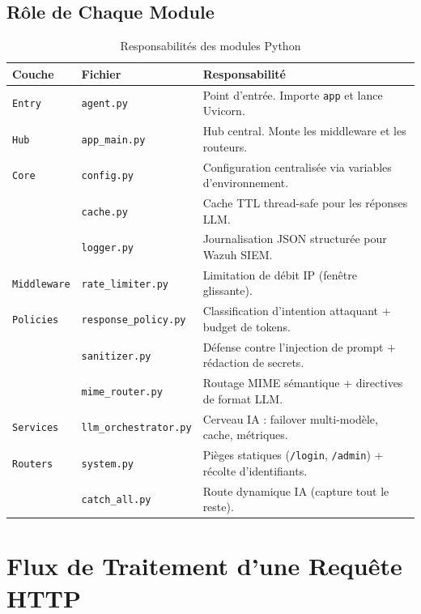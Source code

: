 \documentclass[12pt,a4paper]{article}
\begin{document}
\subsection{Rôle de Chaque Module}

\begin{table}[h!]
\centering
\small
\begin{tabularx}{\textwidth}{l l X}
\toprule
\textbf{Couche} & \textbf{Fichier} & \textbf{Responsabilité} \\
\midrule
\texttt{Entry} & \texttt{agent.py} & Point d'entrée. Importe \texttt{app} et lance Uvicorn. \\
\texttt{Hub} & \texttt{app\_main.py} & Hub central. Monte les middleware et les routeurs. \\
\midrule
\texttt{Core} & \texttt{config.py} & Configuration centralisée via variables d'environnement. \\
 & \texttt{cache.py} & Cache TTL thread-safe pour les réponses LLM. \\
 & \texttt{logger.py} & Journalisation JSON structurée pour Wazuh SIEM. \\
\midrule
\texttt{Middleware} & \texttt{rate\_limiter.py} & Limitation de débit IP (fenêtre glissante). \\
\midrule
\texttt{Policies} & \texttt{response\_policy.py} & Classification d'intention attaquant + budget de tokens. \\
 & \texttt{sanitizer.py} & Défense contre l'injection de prompt + rédaction de secrets. \\
 & \texttt{mime\_router.py} & Routage MIME sémantique + directives de format LLM. \\
\midrule
\texttt{Services} & \texttt{llm\_orchestrator.py} & Cerveau IA : failover multi-modèle, cache, métriques. \\
\midrule
\texttt{Routers} & \texttt{system.py} & Pièges statiques (\texttt{/login}, \texttt{/admin}) + récolte d'identifiants. \\
 & \texttt{catch\_all.py} & Route dynamique IA (capture tout le reste). \\
\bottomrule
\end{tabularx}
\caption{Responsabilités des modules Python}
\end{table}

\section{Flux de Traitement d'une Requête HTTP}
\end{document}
